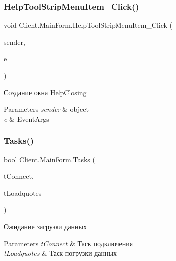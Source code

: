 \subsubsection{\texorpdfstring{Help\+Tool\+Strip\+Menu\+Item\+\_\+\+Click()}{HelpToolStripMenuItem\_Click()}}
{\footnotesize\ttfamily void Client.\+Main\+Form.\+Help\+Tool\+Strip\+Menu\+Item\+\_\+\+Click (\begin{DoxyParamCaption}\item[{object}]{sender,  }\item[{Event\+Args}]{e }\end{DoxyParamCaption})\hspace{0.3cm}{\ttfamily [inline]}}



Создание окна Help\+Closing 


\begin{DoxyParams}{Parameters}
{\em sender} & object\\
\hline
{\em e} & Event\+Args\\
\hline
\end{DoxyParams}
\hypertarget{class_client_1_1_main_form_a48f67f872cf157e9be746823e1cba8e8}{}\label{class_client_1_1_main_form_a48f67f872cf157e9be746823e1cba8e8} 
\subsubsection{\texorpdfstring{Tasks()}{Tasks()}}
{\footnotesize\ttfamily bool Client.\+Main\+Form.\+Tasks (\begin{DoxyParamCaption}\item[{Task}]{t\+Connect,  }\item[{Task}]{t\+Loadquotes }\end{DoxyParamCaption})\hspace{0.3cm}{\ttfamily [inline]}}



Ожидание загрузки данных 


\begin{DoxyParams}{Parameters}
{\em t\+Connect} & Таск подключения\\
\hline
{\em t\+Loadquotes} & Таск погрузки данных\\
\hline
\end{DoxyParams}
\hypertarget{class_client_1_1_main_form_ae422739b1b0042a9b697ea2c446ac7c5}{}\label{class_client_1_1_main_form_ae422739b1b0042a9b697ea2c446ac7c5} 
